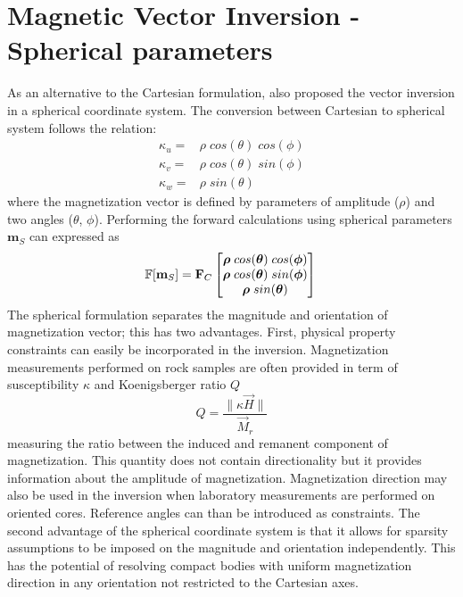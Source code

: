 \section{Magnetic Vector Inversion - Spherical parameters}
As an alternative to the Cartesian formulation, \cite{LelievreOldenburg2009} also proposed the vector inversion in a spherical coordinate system.
The conversion between Cartesian to spherical system follows the relation:
\begin{equation}\label{eq:Cart_to_Spherical}
\begin{split}
\kappa_u = & \rho \; cos(\theta)\;cos(\phi) \\
\kappa_v = & \rho \; cos(\theta)\;sin(\phi) \\
\kappa_w = & \rho \; sin(\theta)
\end{split}
\end{equation}
where the magnetization vector is defined by parameters of amplitude (${\rho}$) and two angles (${\theta}$, ${\phi}$). Performing the forward calculations using spherical parameters $\mathbf{m}_S$ can expressed as
\begin{equation}
\mathbb{F}[\mathbf{m}_S] = \mathbf{F}_C
\begin{bmatrix}
\boldsymbol{\rho} \; cos(\boldsymbol{\theta})\;cos(\boldsymbol{\phi}) \\
\boldsymbol{\rho} \; cos(\boldsymbol{\theta})\;sin(\boldsymbol{\phi}) \\
\boldsymbol{\rho} \; sin(\boldsymbol{\theta})
\end{bmatrix} \\
\end{equation}
The spherical formulation separates the magnitude and orientation of magnetization vector; this has two advantages. First, physical property constraints can easily be incorporated in the inversion. Magnetization measurements performed on rock samples are often provided in term of susceptibility $\kappa$ and Koenigsberger ratio $Q$
\begin{equation}
Q = \frac{\| \kappa \vec H\|}{\vec M_{r}}
\end{equation}
measuring the ratio between the induced and remanent component of magnetization. This quantity does not contain directionality but it provides information about the amplitude of magnetization. Magnetization direction may also be used in the inversion when laboratory measurements are performed on oriented cores. Reference angles can than be introduced as constraints.
The second advantage of the spherical coordinate system is that it allows for sparsity assumptions to be  imposed on the magnitude and orientation independently. This has the potential of resolving compact bodies with uniform magnetization direction in any orientation not restricted to the Cartesian axes.


